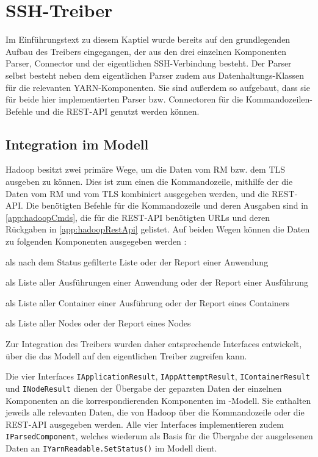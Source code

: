 \section{SSH-Treiber}\label{sec:sshDriver}

Im Einführungstext zu diesem Kaptiel wurde bereits auf den grundlegenden Aufbau des Treibers eingegangen, der aus den drei einzelnen Komponenten Parser, Connector und der eigentlichen SSH-Verbindung besteht. Der Parser selbst besteht neben dem eigentlichen Parser zudem aus Datenhaltungs-Klassen für die relevanten YARN-Komponenten. Sie sind außerdem so aufgebaut, dass sie für beide hier implementierten Parser bzw. Connectoren für die Kommandozeilen-Befehle und die REST-API genutzt werden können.

\subsection{Integration im Modell}\label{sec:modelIntegration}

Hadoop besitzt zwei primäre Wege, um die Daten vom \ac{RM} bzw. dem \ac{TLS} ausgeben zu können. Dies ist zum einen die Kommandozeile, mithilfe der die Daten vom \ac{RM} und vom \ac{TLS} kombiniert ausgegeben werden, und die REST-API. Die benötigten Befehle für die Kommandozeile und deren Ausgaben sind in \autoref{app:hadoopCmds}, die für die REST-API benötigten URLs und deren Rückgaben in \autoref{app:hadoopRestApi} gelistet. Auf beiden Wegen können \uA die Daten zu folgenden Komponenten ausgegeben werden \cite{HadoopYarnTlServer271,HadoopYarnCmds271,HadoopRmApi271,HadoopNmApi271}:

\begin{description}[noitemsep]
    \item[Anwendungen] als nach dem Status gefilterte Liste oder der Report einer Anwendung
    \item[Ausführungen] als Liste aller Ausführungen einer Anwendung oder der Report einer Ausführung
    \item[Container] als Liste aller Container einer Ausführung oder der Report eines Containers
    \item[Nodes] als Liste aller Nodes oder der Report eines Nodes
\end{description}

Zur Integration des Treibers wurden daher entsprechende Interfaces entwickelt, über die das Modell auf den eigentlichen Treiber zugreifen kann.

Die vier Interfaces \texttt{IApplicationResult}, \texttt{IAppAttemptResult}, \texttt{IContainerResult} und \texttt{INodeResult} dienen der Übergabe der geparsten Daten der einzelnen Komponenten an die korrespondierenden Komponenten im \sS-Modell. Sie enthalten jeweils alle relevanten Daten, die von Hadoop über die Kommandozeile oder die REST-API ausgegeben werden. Alle vier Interfaces implementieren zudem \texttt{IParsedComponent}, welches wiederum als Basis für die Übergabe der ausgelesenen Daten an \texttt{IYarnReadable.SetStatus()} im Modell dient.

